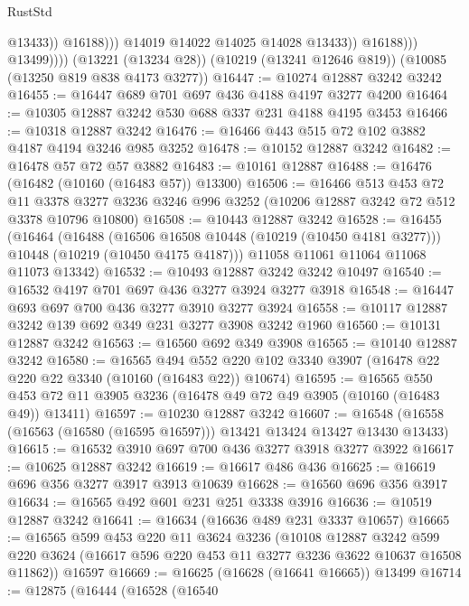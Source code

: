 \begin{lexlean}{RustStd}
\begin{coremodule}
                                @13433))
                            @16188)))
                      @14019
                      @14022
                      @14025
                      @14028
                      @13433))
                  @16188)))
            @13499))))
    (@13221 (@13234 @28))
    (@10219 (@13241 @12646 @819))
    (@10085 (@13250 @819 @838 @4173 @3277))
@16447 := @10274 @12887 @3242 @3242
@16455 := @16447 @689 @701 @697 @436 @4188 @4197 @3277 @4200
@16464 := @10305 @12887 @3242 @530 @688 @337 @231 @4188 @4195 @3453
@16466 := @10318 @12887 @3242
@16476 := @16466 @443 @515 @72 @102 @3882 @4187 @4194 @3246 @985 @3252
@16478 := @10152 @12887 @3242
@16482 := @16478 @57 @72 @57 @3882
@16483 := @10161 @12887
@16488 := @16476 (@16482 (@10160 (@16483 @57)) @13300)
@16506 := @16466
    @513
    @453
    @72
    @11
    @3378
    @3277
    @3236
    @3246
    @996
    @3252
    (@10206 @12887 @3242 @72 @512 @3378 @10796 @10800)
@16508 := @10443 @12887 @3242
@16528 := @16455
    (@16464
      (@16488
        (@16506 @16508 @10448 (@10219 (@10450 @4181 @3277)))
        @10448
        (@10219 (@10450 @4175 @4187)))
      @11058
      @11061
      @11064
      @11068
      @11073
      @13342)
@16532 := @10493 @12887 @3242 @3242 @10497
@16540 := @16532 @4197 @701 @697 @436 @3277 @3924 @3277 @3918
@16548 := @16447 @693 @697 @700 @436 @3277 @3910 @3277 @3924
@16558 := @10117 @12887 @3242 @139 @692 @349 @231 @3277 @3908 @3242 @1960
@16560 := @10131 @12887 @3242
@16563 := @16560 @692 @349 @3908
@16565 := @10140 @12887 @3242
@16580 := @16565
    @494
    @552
    @220
    @102
    @3340
    @3907
    (@16478 @22 @220 @22 @3340 (@10160 (@16483 @22)) @10674)
@16595 := @16565
    @550
    @453
    @72
    @11
    @3905
    @3236
    (@16478 @49 @72 @49 @3905 (@10160 (@16483 @49)) @13411)
@16597 := @10230 @12887 @3242
@16607 := @16548 (@16558 (@16563 (@16580 (@16595 @16597))) @13421 @13424 @13427 @13430 @13433)
@16615 := @16532 @3910 @697 @700 @436 @3277 @3918 @3277 @3922
@16617 := @10625 @12887 @3242
@16619 := @16617 @486 @436
@16625 := @16619 @696 @356 @3277 @3917 @3913 @10639
@16628 := @16560 @696 @356 @3917
@16634 := @16565 @492 @601 @231 @251 @3338 @3916
@16636 := @10519 @12887 @3242
@16641 := @16634 (@16636 @489 @231 @3337 @10657)
@16665 := @16565
    @599
    @453
    @220
    @11
    @3624
    @3236
    (@10108
      @12887
      @3242
      @599
      @220
      @3624
      (@16617 @596 @220 @453 @11 @3277 @3236 @3622 @10637 @16508 @11862))
    @16597
@16669 := @16625 (@16628 (@16641 @16665)) @13499
@16714 := @12875
    (@16444
      (@16528
        (@16540

\end{coremodule}
\end{lexlean}
